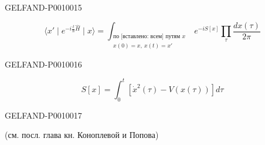 \begin{GelfandAdjacentEvidence}{GELFAND-P001001}{5}

\begin{equation*}
\langle x'\mid e^{-i\frac{t}{\hbar}\widehat H}\mid x\rangle
=\int_{\substack{\text{по [вставлено: всем] путям }x\\x(0)=x,\ x(t)=x'}}
e^{-iS[x]}\prod_\tau\frac{dx(\tau)}{2\pi}
\tag{4}
\end{equation*}
\end{GelfandAdjacentEvidence}
\begin{GelfandAdjacentEvidence}{GELFAND-P001001}{6}

\begin{equation*}
S[x]=\int_0^t[\dot x^2(\tau)-V(x(\tau))]d\tau
\tag{5}
\end{equation*}
\end{GelfandAdjacentEvidence}
\begin{GelfandAdjacentEvidence}{GELFAND-P001001}{7}

(см. посл. глава кн. Коноплевой и Попова)
\end{GelfandAdjacentEvidence}



